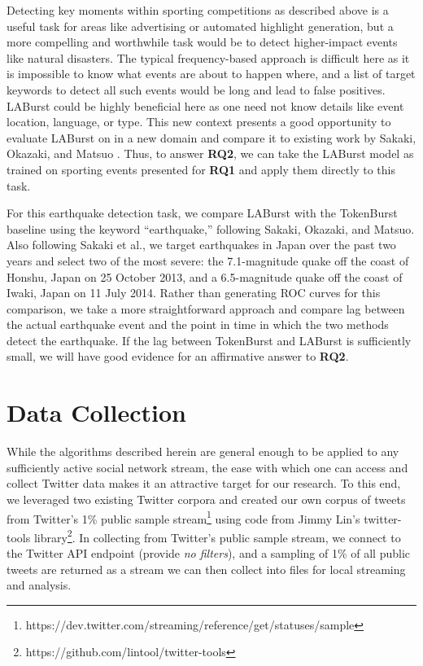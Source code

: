 \documentclass[letterpaper]{article}
\begin{document}
Detecting key moments within sporting competitions as described above is a useful task for areas like advertising or automated highlight generation, but a more compelling and worthwhile task would be to detect higher-impact events like natural disasters.
The typical frequency-based approach is difficult here as it is impossible to know what events are about to happen where, and a list of target keywords to detect all such events would be long and lead to false positives.
LABurst could be highly beneficial here as one need not know details like event location, language, or type.
This new context presents a good opportunity to evaluate LABurst on in a new domain and compare it to existing work by Sakaki, Okazaki, and Matsuo \cite{Sakaki:2010:EST:1772690.1772777}.
Thus, to answer \textbf{RQ2}, we can take the LABurst model as trained on sporting events presented for \textbf{RQ1} and apply them directly to this task.

For this earthquake detection task, we compare LABurst with the TokenBurst baseline using the keyword ``earthquake,'' following Sakaki, Okazaki, and Matsuo.
Also following Sakaki et al., we target earthquakes in Japan over the past two years and select two of the most severe: the 7.1-magnitude quake off the coast of Honshu, Japan on 25 October 2013, and a 6.5-magnitude quake off the coast of Iwaki, Japan on 11 July 2014.
Rather than generating ROC curves for this comparison, we take a more straightforward approach and compare lag between the actual earthquake event and the point in time in which the two methods detect the earthquake.
If the lag between TokenBurst and LABurst is sufficiently small, we will have good evidence for an affirmative answer to \textbf{RQ2}.

\section{Data Collection}

While the algorithms described herein are general enough to be applied to any sufficiently active social network stream, the ease with which one can access and collect Twitter data makes it an attractive target for our research.
To this end, we leveraged two existing Twitter corpora and created our own corpus of tweets from Twitter's 1\% public sample stream\footnote{https://dev.twitter.com/streaming/reference/get/statuses/sample} using code from Jimmy Lin's twitter-tools library\footnote{https://github.com/lintool/twitter-tools}.
In collecting from Twitter's public sample stream, we connect to the Twitter API endpoint (provide \emph{no filters}), and a sampling of 1\% of all public tweets are returned as a stream we can then collect into files for local streaming and analysis.
\end{document}
